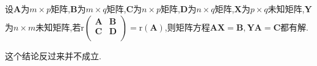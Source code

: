 \documentclass[../../main.tex]{subfiles}
\begin{document}
\begin{corollary}\label{corollary:分块矩阵的秩与单个块的秩相同则矩阵方阵有解}
设$\boldsymbol{A}$为\(m\times p\)矩阵,$\boldsymbol{B}$为\(m\times q\)矩阵,$\boldsymbol{C}$为\(n\times p\)矩阵,$\boldsymbol{D}$为\(n\times q\)矩阵,\(\boldsymbol{X}\)为\(p\times q\)未知矩阵,\(\boldsymbol{Y}\)为\(n\times m\)未知矩阵,若\(\mathrm{r}\left( \begin{matrix}
\boldsymbol{A}&		\boldsymbol{B}\\
\boldsymbol{C}&		\boldsymbol{D}\\
\end{matrix} \right) =\mathrm{r}\left( \boldsymbol{A} \right)  \),则矩阵方程\(\boldsymbol{AX}=\boldsymbol{B},\boldsymbol{YA}=\boldsymbol{C}\)都有解.
\end{corollary}
\begin{remark}
这个结论反过来并不成立.
\end{remark}
\end{document}
